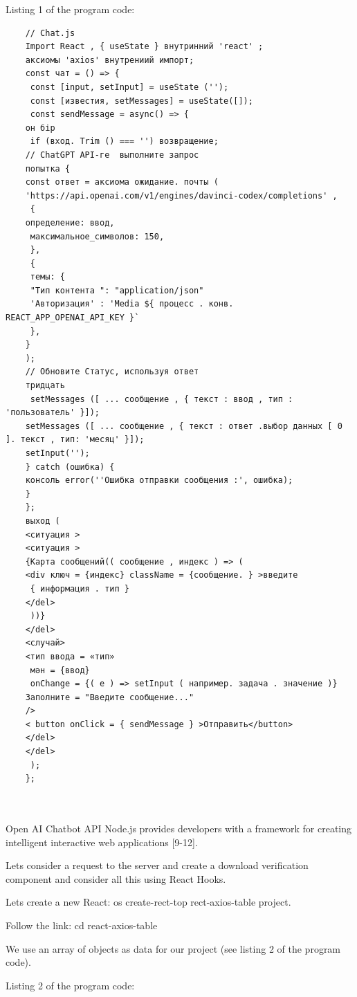 Listing 1 of the program code:
\begin{lstlisting}
	// Chat.js
	Import React , { useState } внутринний 'react' ;
	аксиомы 'axios' внутрениий импорт;
	const чат = () => {
	 const [input, setInput] = useState ('');
	 const [известия, setMessages] = useState([]);
	 const sendMessage = async() => {
	он бір
	 if (вход. Trim () === '') возвращение;
	// ChatGPT API-ге  выполните запрос
	попытка {
	const ответ = аксиома ожидание. почты (
	'https://api.openai.com/v1/engines/davinci-codex/completions' ,
	 {
	определение: ввод,
	 максимальное_символов: 150,
	 },
	 {
	 темы: {
	 "Тип контента ": "application/json"
	 'Авторизация' : 'Media ${ процесс . конв. REACT_APP_OPENAI_API_KEY }` 
	 },
	}
	);
	// Обновите Статус, используя ответ
	тридцать
	 setMessages ([ ... сообщение , { текст : ввод , тип : 'пользователь' }]);
	setMessages ([ ... сообщение , { текст : ответ .выбор данных [ 0 ]. текст , тип: 'месяц' }]);
	setInput('');
	} catch (ошибка) {
	консоль error(''Ошибка отправки сообщения :', ошибка);
	}
	};
	выход (
	<ситуация >
	<ситуация >
	{Карта сообщений(( сообщение , индекс ) => (
	<div ключ = {индекс} className = {сообщение. } >введите
	 { информация . тип }
	</del>
	 ))}
	</del>
	<случай>
	<тип ввода = «тип»
	 мән = {ввод}
	 onChange = {( e ) => setInput ( например. задача . значение )}
	Заполните = "Введите сообщение..."
	/>
	< button onClick = { sendMessage } >Отправить</button>
	</del>
	</del>
	 );
	};
	
	

\end{lstlisting}


\begin{multicols}{2}

Open AI Chatbot API Node.js provides developers with a framework for
creating intelligent interactive web applications {[}9-12{]}.

Let\textquotesingle s consider a request to the server and create a
download verification component and consider all this using React Hooks.

Let\textquotesingle s create a new React: os create-rect-top
rect-axios-table project.

Follow the link: cd react-axios-table
\end{multicols}
\begin{multicols}{2}
We use an array of objects as data for our project (see listing 2 of the
program code).

Listing 2 of the program code:

\end{multicols}

